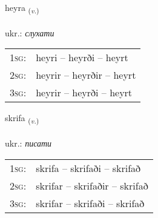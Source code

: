 \documentclass[frontgrid, backgrid]{flacards}\usepackage[]{graphicx}\usepackage[]{xcolor}
\begin{document}
\renewcommand{\flhead}{\vskip5pt \fboxsep=0pt {\small\bfseries\footnotesize Sagnorð | дієслово}}
\renewcommand{\fcfoot}{\vskip5pt \fboxsep=0pt \hspace{2pt}{\small\bfseries\footnotesize 1K}}

\renewcommand{\blhead}{\vskip5pt {\small\bfseries\footnotesize Sagnorð | дієслово }}
\renewcommand{\bcfoot}{\vskip5pt \hspace{2pt}{\small\bfseries\footnotesize 1K}}


{heyra \small{\textsubscript{(\textit{v.})}} \\[1ex] %
\textphonetic{[heiːra]} \\
ukr.: \emph{слухати} \\  [2ex]
\renewcommand*{\arraystretch}{0.8}
\begin{tabular}{p{1cm}l}
\textsc{1sg}: & heyri -- heyrði -- heyrt \\ 
\textsc{2sg}: & heyrir -- heyrðir -- heyrt \\ 
\textsc{3sg}: & heyrir -- heyrði -- heyrt \\ 
\end{tabular}
}

\renewcommand{\flhead}{\vskip5pt \fboxsep=0pt {\small\bfseries\footnotesize Sagnorð | дієслово}}
\renewcommand{\fcfoot}{\vskip5pt \fboxsep=0pt \hspace{2pt}{\small\bfseries\footnotesize 1K}}

\renewcommand{\blhead}{\vskip5pt {\small\bfseries\footnotesize Sagnorð | дієслово }}
\renewcommand{\bcfoot}{\vskip5pt \hspace{2pt}{\small\bfseries\footnotesize 1K}}


{skrifa \small{\textsubscript{(\textit{v.})}} \\[1ex] %
\textphonetic{[skrɪːva]} \\
ukr.: \emph{писати} \\  [2ex]
\renewcommand*{\arraystretch}{0.8}
\begin{tabular}{p{1cm}l}
\textsc{1sg}: & skrifa -- skrifaði -- skrifað \\ 
\textsc{2sg}: & skrifar -- skrifaðir -- skrifað \\ 
\textsc{3sg}: & skrifar -- skrifaði -- skrifað \\ 
\end{tabular}
}
\end{document}
